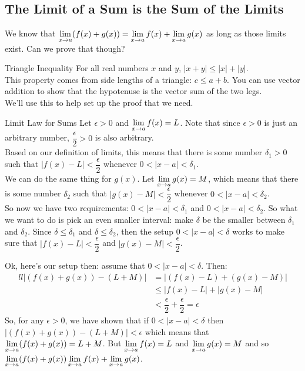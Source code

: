 \subsection*{The Limit of a Sum is the Sum of the Limits}

We know that $\displaystyle \lim_{x\to a} (f(x)+g(x)) = \displaystyle \lim_{x\to a}f(x)+\displaystyle \lim_{x\to a} g(x)$ as long as those limits exist. Can we prove that though?

\begin{defn}{Triangle Inequality}
For all real numbers $x$ and $y$, $|x+y|\leq|x|+|y|$.\\

This property comes from side lengths of a triangle: $c\leq a+b$. You can use vector addition to show that the hypotenuse is the vector sum of the two legs.\\

We'll use this to help set up the proof that we need.
\end{defn}

\begin{prf}{Limit Law for Sums}
Let $\epsilon>0$ and $\displaystyle \lim_{x\to a}f(x)=L$. Note that since $\epsilon>0$ is just an arbitrary number, $\dfrac{\epsilon}{2}>0$ is also arbitrary.\\

Based on our definition of limits, this means that there is some number $\delta_1>0$ such that $|f(x)-L|<\dfrac{\epsilon}{2}$ whenever $0<|x-a|<\delta_1$.\\

We can do the same thing for $g(x)$. Let $\displaystyle \lim_{x\to a}g(x)=M$, which means that there is some number $\delta_2$ such that $|g(x)-M|<\dfrac{\epsilon}{2}$ whenever $0<|x-a|<\delta_2$.\\

So now we have two requirements: $0<|x-a|<\delta_1$ and $0<|x-a|<\delta_2$. So what we want to do is pick an even smaller interval: make $\delta$ be the smaller between $\delta_1$ and $\delta_2$. Since $\delta\leq\delta_1$ and $\delta\leq\delta_2$, then the setup $0<|x-a|<\delta$ works to make sure that $|f(x)-L|<\dfrac{\epsilon}{2}$ and $|g(x)-M|<\dfrac{\epsilon}{2}$.

Ok, here's our setup then: assume that $0<|x-a|<\delta$. Then:\\

\begin{align*}{ll}
  |\left(f(x)+g(x)\right) - (L+M)| & = |(f(x)-L)+(g(x)-M)|\\
  & \leq |f(x)-L| + |g(x)-M|\\
  &< \dfrac{\epsilon}{2}+\dfrac{\epsilon}{2} = \epsilon
\end{align*}
So, for any $\epsilon>0$, we have shown that if $0<|x-a|<\delta$ then $|(f(x)+g(x))-(L+M)|<\epsilon$ which means that $\displaystyle \lim_{x\to a}(f(x)+g(x))=L+M$. But $\displaystyle \lim_{x\to a}f(x)=L$ and $\displaystyle \lim_{x\to a}g(x)=M$ and so $\displaystyle \lim_{x\to a}(f(x)+g(x)) \displaystyle \lim_{x\to a}f(x)+\displaystyle \lim_{x\to a}g(x)$.
\end{prf}

